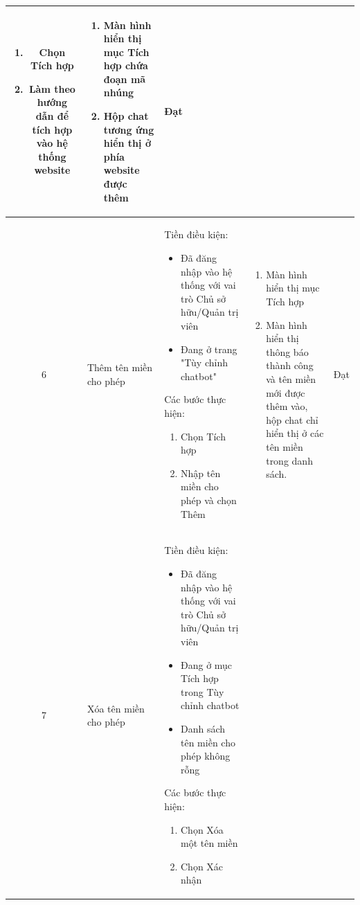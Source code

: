 \begin{longtable}{|c|m{2.5cm}|m{5.5cm}|m{4.5cm}|c|}
\begin{enumerate}[label=\arabic*.]
    \item Chọn Tích hợp
    \item Làm theo hướng dẫn để tích hợp vào hệ thống website
\end{enumerate}
& 
\begin{enumerate}[label=\arabic*.]
    \item Màn hình hiển thị mục Tích hợp chứa đoạn mã nhúng
    \item Hộp chat tương ứng hiển thị ở phía website được thêm
\end{enumerate}  & Đạt \\
\hline
6 & 
Thêm tên miền cho phép & 
Tiền điều kiện:
\begin{itemize}
    \item Đã đăng nhập vào hệ thống với vai trò Chủ sở hữu/Quản trị viên
    \item Đang ở trang "Tùy chỉnh chatbot"
\end{itemize}
Các bước thực hiện: 
\begin{enumerate}[label=\arabic*.]
    \item Chọn Tích hợp
    \item Nhập tên miền cho phép và chọn Thêm
\end{enumerate}
& 
\begin{enumerate}[label=\arabic*.]
    \item Màn hình hiển thị mục Tích hợp
    \item Màn hình hiển thị thông báo thành công và tên miền mới được thêm vào, hộp chat chỉ hiển thị ở các tên miền trong danh sách.
\end{enumerate}  & Đạt \\
\hline
7 & 
Xóa tên miền cho phép & 
Tiền điều kiện:
\begin{itemize}
    \item Đã đăng nhập vào hệ thống với vai trò Chủ sở hữu/Quản trị viên
    \item Đang ở mục Tích hợp trong Tùy chỉnh chatbot
    \item Danh sách tên miền cho phép không rỗng
\end{itemize}
Các bước thực hiện: 
\begin{enumerate}[label=\arabic*.]
    \item Chọn Xóa một tên miền
    \item Chọn Xác nhận
\end{enumerate}
& 
\begin{enumerate}[label=\arabic*.]

\end{enumerate}
\end{longtable}
